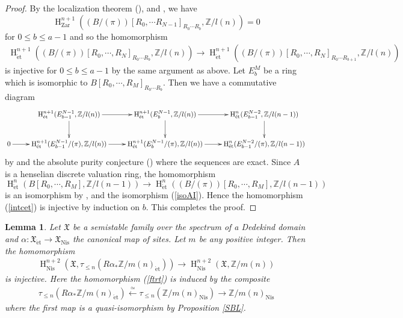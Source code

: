 \documentclass{article}
\newtheorem{lem}[thm]{\indent \sc Lemma}
\newcommand{\et}{\mathrm{\acute{e}t}}
\newcommand{\Nis}{\mathrm{Nis}}
\newcommand{\Zar}{\mathrm{Zar}}
\newcommand{\HO}{\operatorname{H}}
\begin{document}
\begin{proof}
By the localization theorem (\cite[p.779, Theorem 3.2]{Ge}), \cite[p.781, Corollary 3.5]{Ge} 
and \cite[p.786, Corollary 4.4]{Ge}, 
we have
%
\begin{equation*}
\HO^{n+1}_{\Zar}\left(
(B/(\pi))[R_{0}, \cdots R_{N-1}]_{R_{0}\cdots R_{b}},
\mathbb{Z}/l(n)
\right)
=0
\end{equation*}
%
for $0\leq b\leq a-1$ and so the homomorphism
%
\begin{align*}
\HO^{n+1}_{\et}\left(
(B/(\pi))[
R_{0}, \cdots, R_{N}
]_{R_{0}\cdots R_{b}},
\mathbb{Z}/l(n)
\right)    
\to
\HO^{n+1}_{\et}\left(
(B/(\pi))[
R_{0}, \cdots, R_{N}
]_{R_{0}\cdots R_{b+1}},
\mathbb{Z}/l(n)
\right)
\end{align*}
%
is injective for $0\leq b\leq a-1$ by the same argument as above.
Let $E^{M}_{b}$ be a ring which is isomorphic to
$B[R_{0}, \cdots, R_{M}]_{R_{0}\cdots R_{b}}$.
Then we have a commutative diagram
%
\scriptsize
\begin{equation*}
\xymatrix{
&
\HO^{n+1}_{\et}(
E^{N-1}_{b-1},
\mathbb{Z}/l(n)
)
\ar[r]\ar[d]
&
\HO^{n+1}_{\et}(
E^{N-1}_{b},
\mathbb{Z}/l(n)
)
\ar[r]\ar[d]
&
\HO^{n}_{\et}(
E^{N-2}_{b-1},
\mathbb{Z}/l(n-1)
) 
\ar[d]
\\
0\ar[r]
&
\HO^{n+1}_{\et}(
E^{N-1}_{b-1}/(\pi),
\mathbb{Z}/l(n)
)
\ar[r]
&
\HO^{n+1}_{\et}(
E^{N-1}_{b}/(\pi),
\mathbb{Z}/l(n)
)
\ar[r]
&
\HO^{n}_{\et}(
E^{N-2}_{b-1}/(\pi),
\mathbb{Z}/l(n-1)
)
}    
\end{equation*}
\normalsize
%
by \cite[p.774, Theorem 1.2.4]{Ge} and the absolute purity conjecture (\cite{G}) where the sequences are exact. 
Since $A$ is a henselian discrete valuation ring, the homomorphism
%
\begin{equation*}
\HO^{n}_{\et}(
B[R_{0}, \cdots, R_{M}],
\mathbb{Z}/l(n-1)
)
\to
\HO^{n}_{\et}\left(
(B/(\pi))[R_{0}, \cdots, R_{M}],
\mathbb{Z}/l(n-1)
\right)
\end{equation*}
%
is an isomorphism
by \cite[p.774, Theorem 1.2.3]{Ge},
\cite[p.240, VI, Corollary 4.20]{M}
and the isomorphism (\ref{isoAI}).
Hence the homomorphism (\ref{intcet})
is injective by induction on $b$. This completes the proof.
\end{proof}
%

%
\begin{lem}\upshape\label{inVaniTr}
Let $\mathfrak{X}$ be a semistable family over the spectrum of 
a Dedekind domain
and 
$\alpha: \mathfrak{X}_{\et}\to \mathfrak{X}_{\Nis}$
the canonical map of sites.
Let $m$ be any positive integer.
Then the homomorphism
%
\begin{align}\label{ftrt}
\HO^{n+2}_{\Nis}\left(
\mathfrak{X}, 
\tau_{\leq n}(R\alpha_{*}\mathbb{Z}/m(n)_{\et})
\right)
\to
\HO^{n+2}_{\Nis}(
\mathfrak{X},
\mathbb{Z}/m(n)
)
\end{align}
%
is injective. Here the homomorphism (\ref{ftrt}) is induced by the composite
%
\begin{align*}
\tau_{\leq n}(R\alpha_{*}\mathbb{Z}/m(n)_{\et})
\xleftarrow{\simeq}
\tau_{\leq n}(
\mathbb{Z}/m(n)_{\Nis}
)
\to
\mathbb{Z}/m(n)_{\Nis}
\end{align*}
%
where the first map is a quasi-isomorphism by Proposition \ref{SBL}.
\end{lem}
%
\end{document}
